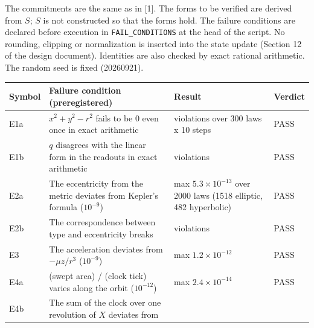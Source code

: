\documentclass[
  a4paper,
]{article}
\newcounter{none} %
\begin{document}
The commitments are the same as in {[}1{]}. The forms to be verified are
derived from \(S\); \(S\) is not constructed so that the forms hold. The
failure conditions are declared before execution in
\texttt{FAIL\_CONDITIONS} at the head of the script. No rounding,
clipping or normalization is inserted into the state update (Section 12
of the design document). Identities are also checked by exact rational
arithmetic. The random seed is fixed (20260921).

{\def\LTcaptype{none} %
\begin{longtable}[]{@{}
  >{\raggedright\arraybackslash}p{}
  >{\raggedright\arraybackslash}p{}
  >{\raggedright\arraybackslash}p{}
  >{\raggedright\arraybackslash}p{}@{}}
\toprule\noalign{}
\begin{minipage}[b]{\linewidth}\raggedright
Symbol
\end{minipage} & \begin{minipage}[b]{\linewidth}\raggedright
Failure condition (preregistered)
\end{minipage} & \begin{minipage}[b]{\linewidth}\raggedright
Result
\end{minipage} & \begin{minipage}[b]{\linewidth}\raggedright
Verdict
\end{minipage} \\
\midrule\noalign{}
\endhead
\bottomrule\noalign{}
\endlastfoot
E1a & \(x^2+y^2-r^2\) fails to be 0 even once in exact arithmetic & 0
violations over 300 laws x 10 steps & PASS \\
E1b & \(q\) disagrees with the linear form in the readouts in exact
arithmetic & 0 violations & PASS \\
E2a & The eccentricity from the metric deviates from Kepler's formula
(\(10^{-9}\)) & max \(5.3\times10^{-13}\) over 2000 laws (1518 elliptic,
482 hyperbolic) & PASS \\
E2b & The correspondence between type and eccentricity breaks & 0
violations & PASS \\
E3 & The acceleration deviates from \(-\mu z/r^3\) (\(10^{-9}\)) & max
\(1.2\times10^{-12}\) & PASS \\
E4a & (swept area) / (clock tick) varies along the orbit (\(10^{-12}\))
& max \(2.4\times10^{-14}\) & PASS \\
E4b & The sum of the clock over one revolution of \(X\) deviates from

\end{longtable}}
\end{document}
